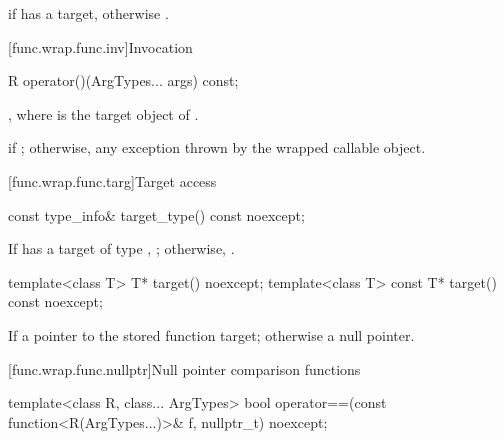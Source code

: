 \begin{itemdescr}
\pnum
\returns
{} if  has a target, otherwise .
\end{itemdescr}

[func.wrap.func.inv]{Invocation}

%
%
\begin{itemdecl}
R operator()(ArgTypes... args) const;
\end{itemdecl}

\begin{itemdescr}
\pnum
\returns
{},
where  is the target object of .

\pnum
\throws
{} if ; otherwise, any
exception thrown by the wrapped callable object.
\end{itemdescr}

[func.wrap.func.targ]{Target access}

%
\begin{itemdecl}
const type_info& target_type() const noexcept;
\end{itemdecl}

\begin{itemdescr}
\pnum
\returns
If  has a target of type ,
  ; otherwise, .
\end{itemdescr}

%
\begin{itemdecl}
template<class T>       T* target() noexcept;
template<class T> const T* target() const noexcept;
\end{itemdecl}

\begin{itemdescr}
\pnum
\returns
If 
a pointer to the stored function target; otherwise a null pointer.
\end{itemdescr}

[func.wrap.func.nullptr]{Null pointer comparison functions}

%
\begin{itemdecl}
template<class R, class... ArgTypes>
  bool operator==(const function<R(ArgTypes...)>& f, nullptr_t) noexcept;
\end{itemdecl}

